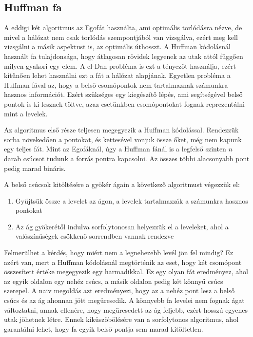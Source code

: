 \documentclass[12pt]{report}
\begin{document}
\subsection{Huffman fa}

A eddigi két algoritmus az Egofát\cite{avin_demand-aware_nodate} használta, ami optimális torlódásra nézve, de mivel a hálózat nem csak torlódás szempontjából van vizsgálva, ezért meg kell vizsgálni a másik aspektust is, az optimális úthosszt.
A Huffman kódolásnál\cite{huf52} használt fa tulajdonsága, hogy átlagosan rövidek legyenek az utak attól függően milyen gyakori egy elem.
A cl-Dan probléma is ezt a tényezőt használja, ezért kitűnően lehet használni ezt a fát a hálózat alapjának.
Egyetlen probléma a Huffman fával az, hogy a belső csomópontok nem tartalmaznak számunkra hasznos információt.
Ezért szükséges egy kiegészítő lépés, ami segítségével belső pontok is ki lesznek töltve, azaz esetünkben csomópontokat fognak reprezentálni mint a levelek.

Az algoritmus első része teljesen megegyezik a Huffman kódolással.
Rendezzük sorba növekedően a pontokat, és kettesével vonjuk össze őket, még nem kapunk egy teljes fát.
Mint az Egofáknál, úgy a Huffman fánál is a legfelső szinten \(n\) darab csúcsot tudunk a forrás pontra kapcsolni.
Az összes többi alacsonyabb pont pedig marad bináris.

A belső csúcsok kitöltésére a gyökér ágain a következő algoritmust végezzük el:
\begin{enumerate}
	\item Gyűjtsük össze a levelet az ágon, a levelek tartalmazzák a számunkra hasznos pontokat 
	\item Az ág gyökerétől indulva sorfolytonosan helyezzük el a leveleket, ahol a valószínűségek csökkenő sorrendben vannak rendezve
\end{enumerate}
 
Felmerülhet a kérdés, hogy miért nem a legnehezebb levél jön fel mindig?
Ez azért van, mert a Huffman kódolásnál megtörténik az eset, hogy két csomópont összesített értéke megegyezik egy harmadikkal.
Ez egy olyan fát eredményez, ahol az egyik oldalon egy nehéz csúcs, a másik oldalon pedig két könnyű csúcs szerepel.
A naiv megoldás azt eredményezi, hogy az a nehéz pont lesz a belső csúcs és az ág ahonnan jött megüresedik.
A könnyebb fa levelei nem fognak ágat változtatni, annak ellenére, hogy megüresedett az ág feljebb, ezért hosszú egyenes utak jöhetnek létre.
Ennek kiküszöbölésére van a sorfolytonos algoritmus, ahol garantálni lehet, hogy fa egyik belső pontja sem marad kitöltetlen.
\end{document}
